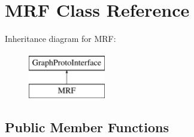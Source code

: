 \hypertarget{classMRF}{
\section{MRF Class Reference}
\label{classMRF}
}
Inheritance diagram for MRF:\begin{figure}[H]
\begin{center}
\leavevmode
\includegraphics[height=2cm]{classMRF}
\end{center}
\end{figure}
\subsection*{Public Member Functions}

